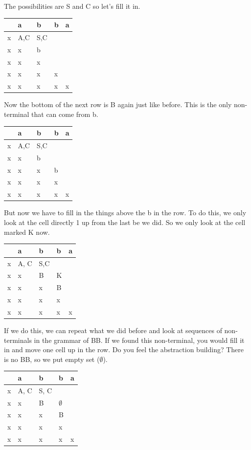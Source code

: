 \documentclass[
  11pt,
  british,
]{article}
\begin{document}
The possibilities are S and C so let's fill it in.

\begin{longtable}[]{@{}lllll@{}}
\toprule
& a & b & b & a \\
\midrule
\endhead
x & A,C & S,C & & \\
x & x & b & & \\
x & x & x & & \\
x & x & x & x & \\
x & x & x & x & x \\
\bottomrule
\end{longtable}

Now the bottom of the next row is B again just like before. This is the
only non-terminal that can come from b.

\begin{longtable}[]{@{}lllll@{}}
\toprule
& a & b & b & a \\
\midrule
\endhead
x & A,C & S,C & & \\
x & x & b & & \\
x & x & x & b & \\
x & x & x & x & \\
x & x & x & x & x \\
\bottomrule
\end{longtable}

But now we have to fill in the things above the b in the row. To do
this, we only look at the cell directly 1 up from the last be we did. So
we only look at the cell marked K now.

\begin{longtable}[]{@{}lllll@{}}
\toprule
& a & b & b & a \\
\midrule
\endhead
x & A, C & S,C & & \\
x & x & B & K & \\
x & x & x & B & \\
x & x & x & x & \\
x & x & x & x & x \\
\bottomrule
\end{longtable}

If we do this, we can repeat what we did before and look at sequences of
non-terminals in the grammar of BB. If we found this non-terminal, you
would fill it in and move one cell up in the row. Do you feel the
abstraction building? There is no BB, so we put empty set
(\(\emptyset\)).

\begin{longtable}[]{@{}lllll@{}}
\toprule
& a & b & b & a \\
\midrule
\endhead
x & A, C & S, C & & \\
x & x & B & \(\emptyset\) & \\
x & x & x & B & \\
x & x & x & x & \\
x & x & x & x & x \\
\bottomrule
\end{longtable}
\end{document}
